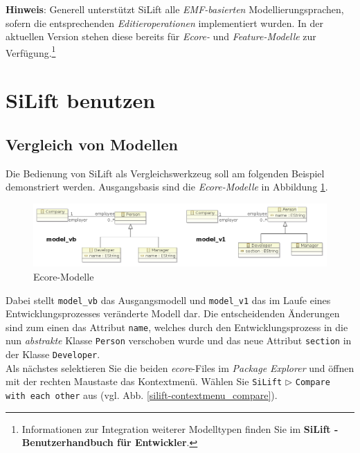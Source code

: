 \documentclass[a4paper]{scrartcl}
\begin{document}
\textbf{Hinweis}: Generell unterstützt SiLift alle \textit{EMF-basierten} Modellierungsprachen, sofern die ent\-sprech\-enden \textit{Editieroperationen} implementiert wurden.
In der aktuellen Version stehen diese bereits für \textit{Ecore-} und \textit{Feature-Modelle} zur Verfügung.\footnote{Informationen zur Integration weiterer Modelltypen finden Sie im \textbf{SiLift - Benutzerhandbuch für Entwickler}.}\\

\section{SiLift benutzen}
\subsection{Vergleich von Modellen}
Die Bedienung von SiLift als Vergleichswerkzeug soll am folgenden Beispiel demonstriert werden.
Ausgangsbasis sind die \textit{Ecore-Modelle} in Abbildung \ref{classdiagram_example}.

\begin{figure}[H]
\centering
\includegraphics[width=\textwidth]{graphics/ecore-classdiagram_example.png}
\caption{Ecore-Modelle}
\label{classdiagram_example}
\end{figure}

Dabei stellt \texttt{model\_vb} das Ausgangsmodell und \texttt{model\_v1} das im Laufe eines Entwicklungsprozesses veränderte Modell dar.
Die entscheidenden Änderungen sind zum einen das Attribut \texttt{name}, welches durch den Entwicklungsprozess in die nun \textit{abstrakte} Klasse \texttt{Person} verschoben wurde und das neue Attribut \texttt{section} in der Klasse \texttt{Developer}.\\
Als nächstes selektieren Sie die beiden \textit{ecore}-Files im \textit{Package Explorer} und öffnen mit der rechten Maustaste das Kontextmenü.
Wählen Sie \texttt{SiLift} $\triangleright$ \texttt{Compare with each other} aus (vgl. Abb. \ref{silift-contextmenu_compare}).
\end{document}
